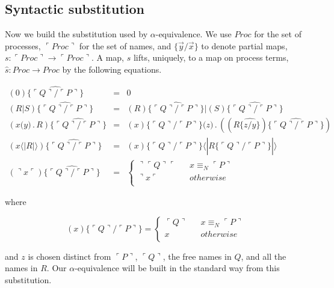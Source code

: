 \documentclass[]{amsart}
\newcommand{\lliftb}{\langle\!|}
\newcommand{\rliftb}{|\!\rangle}
\newcommand{\lpquote}{\ulcorner}
\newcommand{\rpquote}{\urcorner}
\newcommand{\id}[1]{\texttt{#1}}
\newcommand{\juxtap}{\mathbin{\id{|}}}
\newcommand{\concat}{\mathbin{.}}
\newcommand{\nameeq}{\mathbin{\equiv_N}}
\newcommand{\lift}[2]{#1 \lliftb #2 \rliftb}
\newcommand{\quotep}[1]{\lpquote #1 \rpquote}
\newcommand{\dropn}[1]{\rpquote #1 \lpquote}
\newcommand{\substp}[2]{\id{\{} \quotep{#1} / \quotep{#2} \id{\}}}
\newcommand{\substn}[2]{\id{\{} #1 / #2 \id{\}}}
\newcommand{\psubstp}[2]{\widehat{\substp{#1}{#2}}}
\newcommand{\psubstn}[2]{\widehat{\substn{#1}{#2}}}
\newcommand{\Proc}{\mathbin{Proc}}
\newcommand{\QProc}{\quotep{\mathbin{Proc}}}
\theoremstyle{definition}
\theoremstyle{remark}
\numberwithin{equation}{subsection}
\begin{document}
\subsection{Syntactic substitution}

Now we build the substitution used by $\alpha$-equivalence. We use
$\Proc$ for the set of processes, $\QProc$ for the set of names, and
$\id{\{}\vec{y} / \vec{x} \id{\}}$ to denote partial maps, $s : \QProc
\rightarrow \QProc$. A map, $s$ lifts, uniquely, to a map on process terms, $\widehat{s} :
\Proc \rightarrow \Proc$ by the following equations.

\begin{eqnarray*}
(0) \psubstp{Q}{P}         & = &    0 \\
(R \juxtap S) \psubstp{Q}{P}
		& = &    
		(R)\psubstp{Q}{P} \juxtap (S) \psubstp{Q}{P} \\
(x \id{(} y\id{)}\concat R) \psubstp{Q}{P}    
		& = &    
		(x)\substp{Q}{P} \id{(}z\id{)}\concat( (R \psubstn{z}{y}) \psubstp{Q}{P} ) \\
(\lift{x}{R}) \psubstp{Q}{P}  
 		& = &
 		\lift{(x)\substp{Q}{P}}{ R \psubstp{Q}{P} } \\
(\dropn{x})  \psubstp{Q}{P}       
		& = & 
		\left\{ 
			\begin{array}{ccc} 
				\dropn{\quotep{Q}} & & x \nameeq \quotep{P} \\
                              	\dropn{x} & & otherwise \\
			\end{array}
		\right.
\end{eqnarray*}
 

where

\begin{equation*}
(x)\id{\{} \lpquote Q \rpquote / \lpquote P \rpquote \id{\}}            = 
		\left\{ 
			\begin{array}{ccc}
				\lpquote Q \rpquote & & x \nameeq \lpquote P \rpquote \\
                                x & & otherwise \\
			\end{array}
		\right.
\end{equation*}

and $z$ is chosen distinct from $\quotep{P}$, $\quotep{Q}$, the free
names in $Q$, and all the names in $R$. Our $\alpha$-equivalence will
be built in the standard way from this substitution.
\end{document}

